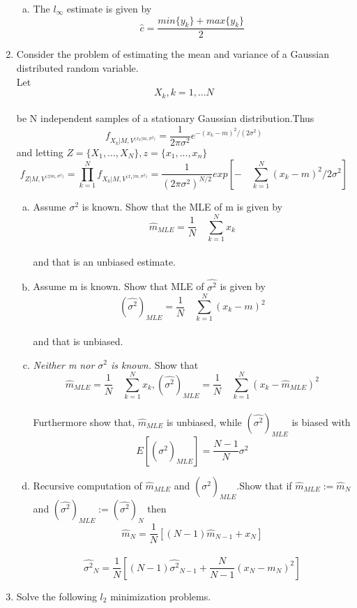 \documentclass[journal,12pt,onecolumn]{IEEEtran}
\begin{document}
\begin{enumerate}
\begin{enumerate}[(a)]
\item The $l_\infty$ estimate is given by
$$\hat{c}=\frac{min\{{y_k}\}+max\{y_k\}}{2}$$
\end{enumerate}
\item Consider the problem of estimating the mean and variance of a Gaussian distributed random variable.\\

Let
$${X_k}, {k=1},... N$$\\
be N independent samples of a stationary Gaussian distribution.Thus\\
$$f_{{X_k}|{M},{V^{{(x_k}|m,{\sigma^2})}}}=\frac{1}{2\pi\sigma^2}e^{-(x_k-m)^2/(2\sigma^2)}$$
and letting $Z=\{{X_1},...,{X_N}\},z=\{x_1,...,x_n\}$
$$f_{{Z|M},{V^{{(z|m,\sigma^2})}}}=\prod_{k=1}^{N}f_{{X_k}|{M},{V^{{(x_1}|m,{\sigma^2})}}}=\frac{1}{(2\pi\sigma^2)^{N/2}}exp[-\quad\sum_{k=1}^{N}{({x_k}-m)^2}/{2\sigma^2}]$$
\begin{enumerate}[(a)]
\item Assume $\sigma^2$ is known. Show that the MLE of m is given by
$$\hat{m}_{MLE}=\frac{1}{N}\quad\sum_{k=1}^{N}x_{k}$$\\
and that is an unbiased estimate.
\item Assume m is known. Show that MLE of  $\hat{\sigma^2}$ is given by
$$(\hat{\sigma^2})_{MLE}=\frac{1}{N}\quad\sum_{k=1}^{N}({x_k}-m)^2$$\\
and that is unbiased.
\item\textit{Neither m nor $\sigma^2$ is known.} Show that
$$\hat{m}_{MLE}=\frac{1}{N}\quad\sum_{k=1}^{N}x_{k},  (\hat{\sigma^2})_{MLE}=\frac{1}{N}\quad\sum_{k=1}^{N}({x_k}-\hat{m}_{MLE})^2$$\\
Furthermore show that, $\hat{m}_{MLE}$ is unbiased, while $(\hat{\sigma^2})_{MLE}$ is biased with\\
$$E[(\hat{\sigma^2})_{MLE}]=\frac{N-1}{N}\sigma^2$$
\item Recursive computation of $\hat{m}_{MLE}$ and $(\hat{\sigma^2})_{MLE}$.Show that if $\hat{m}_{MLE}:=\hat{m}_{N}$ and $(\hat{\sigma^2})_{MLE}:=(\hat{\sigma^2})_{N}$ then
$$\hat{m}_{N}=\frac{1}{N}[(N-1)\hat{m}_{N-1}+x_{N}]$$\\
$$\hat{\sigma^2}_{N}=\frac{1}{N}[(N-1)\hat{\sigma^2}_{N-1}+\frac{N}{N-1}(x_{N}-m_{N})^2]$$
\end{enumerate}

\item Solve the following $l_2$ minimization problems.


\end{enumerate}
\end{document}
